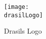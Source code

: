 \begin{figure}[H]
    \centering
    \caption{Drasils Logo}
    \label{fig:drasilLogo}

    \texttt{[image: \\drasilLogo]}
\end{figure}
